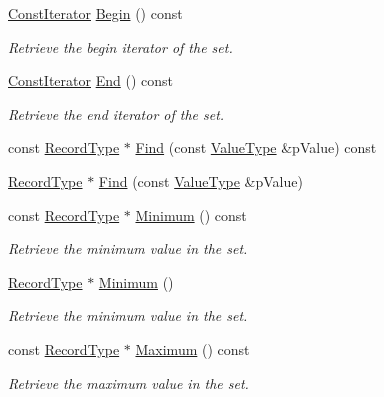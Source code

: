 \begin{DoxyCompactItemize}
\hyperlink{class_fbx_set_af9aee2f7b6a6638b816ea95bd510928c}{Const\+Iterator} \hyperlink{class_fbx_set_a1435632a44bad20741d19be792f0b6c0}{Begin} () const
\begin{DoxyCompactList}\small\item\em Retrieve the begin iterator of the set. \end{DoxyCompactList}\item 
\hyperlink{class_fbx_set_af9aee2f7b6a6638b816ea95bd510928c}{Const\+Iterator} \hyperlink{class_fbx_set_a2d12954434e697202a703cb574072e9d}{End} () const
\begin{DoxyCompactList}\small\item\em Retrieve the end iterator of the set. \end{DoxyCompactList}\item 
const \hyperlink{class_fbx_set_aa3934cd434a09288204f5e6c99b9cd01}{Record\+Type} $\ast$ \hyperlink{class_fbx_set_a49f1d5af6cdfb5a27af1624c7c2463ae}{Find} (const \hyperlink{class_fbx_set_abb0f1b628634e07825532526e2e92baf}{Value\+Type} \&p\+Value) const
\item 
\hyperlink{class_fbx_set_aa3934cd434a09288204f5e6c99b9cd01}{Record\+Type} $\ast$ \hyperlink{class_fbx_set_ac5bd4cb3958389b323d8375b5b17958f}{Find} (const \hyperlink{class_fbx_set_abb0f1b628634e07825532526e2e92baf}{Value\+Type} \&p\+Value)
\item 
const \hyperlink{class_fbx_set_aa3934cd434a09288204f5e6c99b9cd01}{Record\+Type} $\ast$ \hyperlink{class_fbx_set_a11cee93b66335569aa45fbcd886ae9ff}{Minimum} () const
\begin{DoxyCompactList}\small\item\em Retrieve the minimum value in the set. \end{DoxyCompactList}\item 
\hyperlink{class_fbx_set_aa3934cd434a09288204f5e6c99b9cd01}{Record\+Type} $\ast$ \hyperlink{class_fbx_set_a26fc1b8f0649dc4e12ad440169260df7}{Minimum} ()
\begin{DoxyCompactList}\small\item\em Retrieve the minimum value in the set. \end{DoxyCompactList}\item 
const \hyperlink{class_fbx_set_aa3934cd434a09288204f5e6c99b9cd01}{Record\+Type} $\ast$ \hyperlink{class_fbx_set_af9e8e6c464ef4f379218c3ae85e211da}{Maximum} () const
\begin{DoxyCompactList}\small\item\em Retrieve the maximum value in the set. \end{DoxyCompactList}\item 

\end{DoxyCompactItemize}
